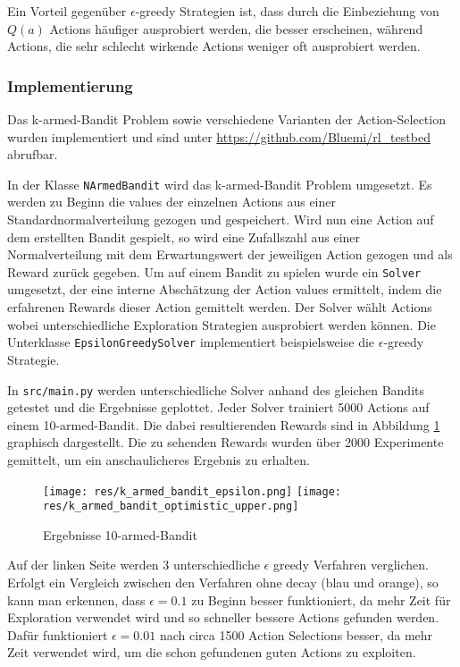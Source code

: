 \documentclass[11pt]{scrartcl}
\begin{document}
Ein Vorteil gegenüber $\epsilon$-greedy Strategien ist, dass durch die Einbeziehung von
$Q(a)$ Actions häufiger ausprobiert werden, die besser erscheinen, während Actions, die
sehr schlecht wirkende Actions weniger oft ausprobiert werden.


\subsubsection{Implementierung}
Das k-armed-Bandit Problem sowie verschiedene Varianten der Action-Selection wurden
implementiert und sind unter \url{https://github.com/Bluemi/rl_testbed} abrufbar.

In der Klasse \lstinline!NArmedBandit! wird das k-armed-Bandit Problem umgesetzt. Es
werden zu Beginn die values der einzelnen Actions aus einer Standardnormalverteilung
gezogen und gespeichert. Wird nun eine Action auf dem erstellten Bandit gespielt, so wird
eine Zufallszahl aus einer Normalverteilung mit dem Erwartungswert der jeweiligen Action
gezogen und als Reward zurück gegeben.
Um auf einem Bandit zu spielen wurde ein \lstinline!Solver! umgesetzt, der eine interne
Abschät\-zung der Action values ermittelt, indem die erfahrenen Rewards dieser Action
gemittelt werden. Der Solver wählt Actions wobei unterschiedliche Exploration Strategien
ausprobiert werden können. Die Unterklasse \lstinline!EpsilonGreedySolver! implementiert
beispielsweise die $\epsilon$-greedy Strategie.

In \lstinline!src/main.py! werden unterschiedliche Solver anhand des gleichen Bandits
getestet und die Ergebnisse geplottet. Jeder Solver trainiert 5000 Actions auf einem
10-armed-Bandit. Die dabei resultierenden Rewards sind in Abbildung
\ref{fig:karmed_bandit} graphisch dargestellt. Die zu sehenden Rewards wurden über 2000
Experimente gemittelt, um ein anschaulicheres Ergebnis zu erhalten.

\begin{figure}[htp]
\centering
\texttt{[image: res/k\_armed\_bandit\_epsilon.png]}
\texttt{[image: res/k\_armed\_bandit\_optimistic\_upper.png]}
\caption{Ergebnisse 10-armed-Bandit}
\label{fig:karmed_bandit}
\end{figure}

\noindent
Auf der linken Seite werden 3 unterschiedliche $\epsilon$ greedy Verfahren verglichen.
Erfolgt ein Vergleich zwischen den Verfahren ohne decay (blau und orange), so kann man
erkennen, dass $\epsilon = 0.1$ zu Beginn besser funktioniert, da mehr Zeit für
Exploration verwendet wird und so schneller bessere Actions gefunden werden. Dafür
funktioniert $\epsilon = 0.01$ nach circa 1500 Action Selections besser, da mehr Zeit
verwendet wird, um die schon gefundenen guten Actions zu exploiten.
\end{document}
